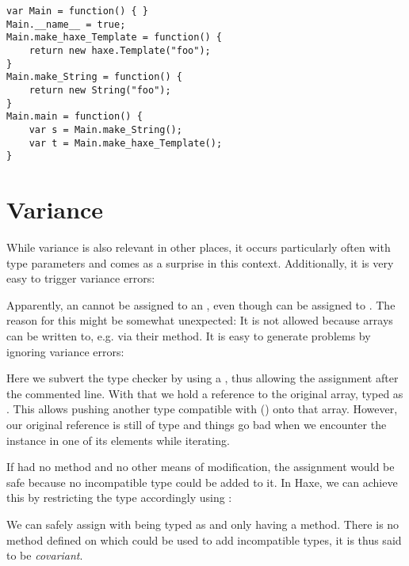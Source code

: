\begin{lstlisting}
var Main = function() { }
Main.__name__ = true;
Main.make_haxe_Template = function() {
	return new haxe.Template("foo");
}
Main.make_String = function() {
	return new String("foo");
}
Main.main = function() {
	var s = Main.make_String();
	var t = Main.make_haxe_Template();
}
\end{lstlisting}

\section{Variance}
\label{type-system-variance}

While variance is also relevant in other places, it occurs particularly often with type parameters and comes as a surprise in this context. Additionally, it is very easy to trigger variance errors:


Apparently, an  cannot be assigned to an , even though  can be assigned to . The reason for this might be somewhat unexpected: It is not allowed because arrays can be written to, e.g. via their  method. It is easy to generate problems by ignoring variance errors:


Here we subvert the type checker by using a , thus allowing the assignment after the commented line. With that we hold a reference  to the original array, typed as . This allows pushing another type compatible with  () onto that array. However, our original reference  is still of type  and things go bad when we encounter the  instance in one of its elements while iterating.

If  had no  method and no other means of modification, the assignment would be safe because no incompatible type could be added to it. In Haxe, we can achieve this by restricting the type accordingly using :


We can safely assign with  being typed as  and  only having a  method. There is no method defined on  which could be used to add incompatible types, it is thus said to be \emph{covariant}.


